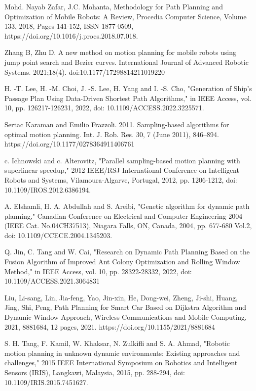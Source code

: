 \begin{thebibliography}{9}
Mohd. Nayab Zafar, J.C. Mohanta,
Methodology for Path Planning and Optimization of Mobile Robots: A Review,
Procedia Computer Science,
Volume 133,
2018,
Pages 141-152,
ISSN 1877-0509,
https://doi.org/10.1016/j.procs.2018.07.018.

Zhang B, Zhu D. A new method on motion planning for mobile robots using jump point search 
and Bezier curves. International Journal of Advanced Robotic Systems. 2021;18(4). doi:10.1177/17298814211019220

H. -T. Lee, H. -M. Choi, J. -S. Lee, H. Yang and I. -S. Cho, "Generation of Ship’s Passage Plan Using 
Data-Driven Shortest Path Algorithms," in IEEE Access, vol. 10, pp. 126217-126231, 2022, 
doi: 10.1109/ACCESS.2022.3225571.

Sertac Karaman and Emilio Frazzoli. 2011. Sampling-based algorithms for optimal motion planning. 
Int. J. Rob. Res. 30, 7 (June      2011), 846–894. https://doi.org/10.1177/0278364911406761

c. Ichnowski and c. Alterovitz, "Parallel sampling-based motion planning with superlinear speedup," 
2012 IEEE/RSJ International Conference on Intelligent Robots and Systems, Vilamoura-Algarve, 
Portugal, 2012, pp. 1206-1212, doi: 10.1109/IROS.2012.6386194.

A. Elshamli, H. A. Abdullah and S. Areibi, "Genetic algorithm for dynamic path planning," 
Canadian Conference on Electrical and Computer Engineering 2004 (IEEE Cat. No.04CH37513), 
Niagara Falls, ON, Canada, 2004, pp. 677-680 Vol.2, doi: 10.1109/CCECE.2004.1345203.

Q. Jin, C. Tang and W. Cai, "Research on Dynamic Path Planning Based on the Fusion Algorithm 
of Improved Ant Colony Optimization and Rolling Window Method," in IEEE Access, vol. 10, pp. 
28322-28332, 2022, doi: 10.1109/ACCESS.2021.3064831

Liu, Li-sang, Lin, Jia-feng, Yao, Jin-xin, He, Dong-wei, Zheng, Ji-shi, Huang, Jing, Shi, 
Peng, Path Planning for Smart Car Based on Dijkstra Algorithm and Dynamic Window Approach, 
Wireless Communications and Mobile Computing, 2021, 8881684, 12 pages, 2021. https://doi.org/10.1155/2021/8881684

S. H. Tang, F. Kamil, W. Khaksar, N. Zulkifli and S. A. Ahmad, "Robotic motion planning in unknown 
dynamic environments: Existing approaches and challenges," 2015 IEEE International Symposium on Robotics 
and Intelligent Sensors (IRIS), Langkawi, Malaysia, 2015, pp. 288-294, doi: 10.1109/IRIS.2015.7451627. 


\end{thebibliography}
